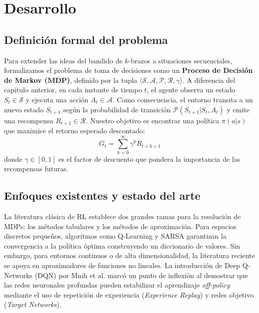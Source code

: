 \section{Desarrollo}

\subsection{Definición formal del problema}
Para extender las ideas del bandido de $k$-brazos a situaciones secuenciales, formalizamos el problema de toma de decisiones como un \textbf{Proceso de Decisión de Markov (MDP)}, definido por la tupla $\langle \mathcal{S}, \mathcal{A}, \mathcal{P}, \mathcal{R}, \gamma \rangle$. A diferencia del capítulo anterior, en cada instante de tiempo $t$, el agente observa un estado $S_t \in \mathcal{S}$ y ejecuta una acción $A_t \in \mathcal{A}$. Como consecuencia, el entorno transita a un nuevo estado $S_{t+1}$ según la probabilidad de transición $\mathcal{P}(S_{t+1} | S_t, A_t)$ y emite una recompensa $R_{t+1} \in \mathcal{R}$. Nuestro objetivo es encontrar una política $\pi(a|s)$ que maximice el retorno esperado descontado:
$$
    G_t = \sum_{k=0}^{\infty} \gamma^k R_{t+k+1}
$$
donde $\gamma \in [0, 1]$ es el factor de descuento que pondera la importancia de las recompensas futuras.

% 

\subsection{Enfoques existentes y estado del arte}
La literatura clásica de RL establece dos grandes ramas para la resolución de MDPs: los métodos tabulares y los métodos de aproximación. Para espacios discretos pequeños, algoritmos como Q-Learning y SARSA garantizan la convergencia a la política óptima construyendo un diccionario de valores. Sin embargo, para entornos continuos o de alta dimensionalidad, la literatura reciente se apoya en aproximadores de funciones no lineales. La introducción de Deep Q-Networks (DQN) por Mnih et al. marcó un punto de inflexión al demostrar que las redes neuronales profundas pueden estabilizar el aprendizaje \textit{off-policy} mediante el uso de repetición de experiencia (\textit{Experience Replay}) y redes objetivo (\textit{Target Networks}).

